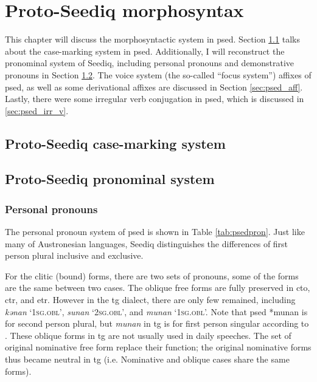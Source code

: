 \chapter{Proto-Seediq morphosyntax} \label{ch5}

This chapter will discuss the morphosyntactic system in \acl{psed}. Section \ref{sec:psed_case} talks about the case-marking system in \acl{psed}. Additionally, I will reconstruct the pronominal system of Seediq, including personal pronouns and demonstrative pronouns in Section \ref{sec:psed_pron}. The voice system (the so-called ``focus system'') affixes of \acl{psed}, as well as some derivational affixes are discussed in Section \ref{sec:psed_aff}. Lastly, there were some irregular verb conjugation in \acl{psed}, which is discussed in \ref{sec:psed_irr_v}.

\section{Proto-Seediq case-marking system} \label{sec:psed_case}
\lipsum[1-10]

\section{Proto-Seediq pronominal system} \label{sec:psed_pron}
\lipsum[1]

\subsection{Personal pronouns}

The personal pronoun system of \acl{psed} is shown in Table \ref{tab:psedpron}. Just like many of Austronesian languages, Seediq distinguishes the differences of first person plural inclusive and exclusive. 

For the clitic (bound) forms, there are two sets of pronouns, some of the forms are the same between two cases. The oblique free forms are fully preserved in \acl{cto}, \acl{ctr}, and \acl{etr}. However in the \acl{tg} dialect, there are only few remained, including \textit{kənan} `\textsc{1sg.obl}', \textit{sunan} `\textsc{2sg.obl}', and \textit{munan} `\textsc{1sg.obl}'. Note that \acl{psed} *munan is for second person plural, but \textit{munan} in \acl{tg} is for first person singular according to \textcite[62]{Sung2018Sedgrammar}. These oblique forms in \acl{tg} are not usually used in daily speeches. The set of original nominative free form replace their function; the original nominative forms thus became neutral in \acl{tg} (i.e. Nominative and oblique cases share the same forms).

